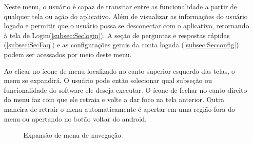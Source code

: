 \documentclass[12pt]{article}
\begin{document}
Neste menu, o usuário é capaz de transitar entre as funcionalidade a partir de qualquer tela ou ação do aplicativo. Além de visualizar as informações do usuário logado e permitir que o usuário possa se desconectar com o aplicativo, retornando à tela de Login(\ref{subsec:Seclogin}). A seção de perguntas e respostas rápidas (\ref{subsec:SecFaq}) e as configurações gerais da conta logada (\ref{subsec:Secconfig}) podem ser acessados por meio deste menu.

Ao clicar no ícone de menu localizado no canto superior esquerdo das telas, o menu se expandirá. O usuário pode então selecionar qual subseção ou funcionalidade do software ele deseja executar. O ícone de fechar no canto direito do menu faz com que ele retraia e volte a dar foco na tela anterior. Outra maneira de retrair o menu automaticamente é apertar em uma região fora do menu ou apertando no botão voltar do android.



\begin{figure}[h!]
  \caption{Expansão de menu de navegação.}
  \label{fig:view_menulat}
\end{figure}
\vfill%
\pagebreak%

\end{document}
